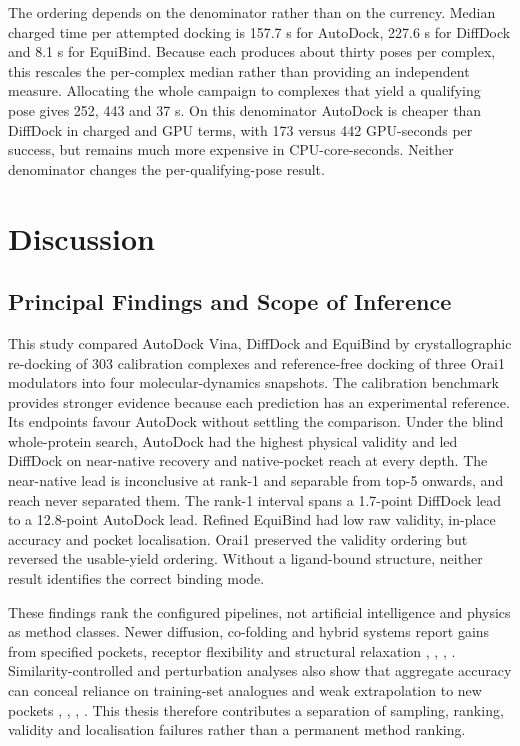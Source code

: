 The ordering depends on the denominator rather than on the currency. Median charged time per attempted docking is 157.7 s for AutoDock, 227.6 s for DiffDock and 8.1 s for EquiBind. Because each produces about thirty poses per complex, this rescales the per-complex median rather than providing an independent measure. Allocating the whole campaign to complexes that yield a qualifying pose gives 252, 443 and 37 s. On this denominator AutoDock is cheaper than DiffDock in charged and GPU terms, with 173 versus 442 GPU-seconds per success, but remains much more expensive in CPU-core-seconds. Neither denominator changes the per-qualifying-pose result.

\hypertarget{discussion}{%
\chapter{\texorpdfstring{Discussion }{Discussion }}\label{discussion}}

\hypertarget{principal-findings-and-scope-of-inference}{%
\section{Principal Findings and Scope of Inference}\label{principal-findings-and-scope-of-inference}}

This study compared AutoDock Vina, DiffDock and EquiBind by crystallographic re-docking of 303 calibration complexes and reference-free docking of three Orai1 modulators into four molecular-dynamics snapshots. The calibration benchmark provides stronger evidence because each prediction has an experimental reference. Its endpoints favour AutoDock without settling the comparison. Under the blind whole-protein search, AutoDock had the highest physical validity and led DiffDock on near-native recovery and native-pocket reach at every depth. The near-native lead is inconclusive at rank-1 and separable from top-5 onwards, and reach never separated them. The rank-1 interval spans a 1.7-point DiffDock lead to a 12.8-point AutoDock lead. Refined EquiBind had low raw validity, in-place accuracy and pocket localisation. Orai1 preserved the validity ordering but reversed the usable-yield ordering. Without a ligand-bound structure, neither result identifies the correct binding mode.

These findings rank the configured pipelines, not artificial intelligence and physics as method classes. Newer diffusion, co-folding and hybrid systems report gains from specified pockets, receptor flexibility and structural relaxation \cite{ref012}, \cite{ref031}, \cite{ref064}, \cite{ref069}. Similarity-controlled and perturbation analyses also show that aggregate accuracy can conceal reliance on training-set analogues and weak extrapolation to new pockets \cite{ref035}, \cite{ref063}, \cite{ref065}, \cite{ref069}. This thesis therefore contributes a separation of sampling, ranking, validity and localisation failures rather than a permanent method ranking.

